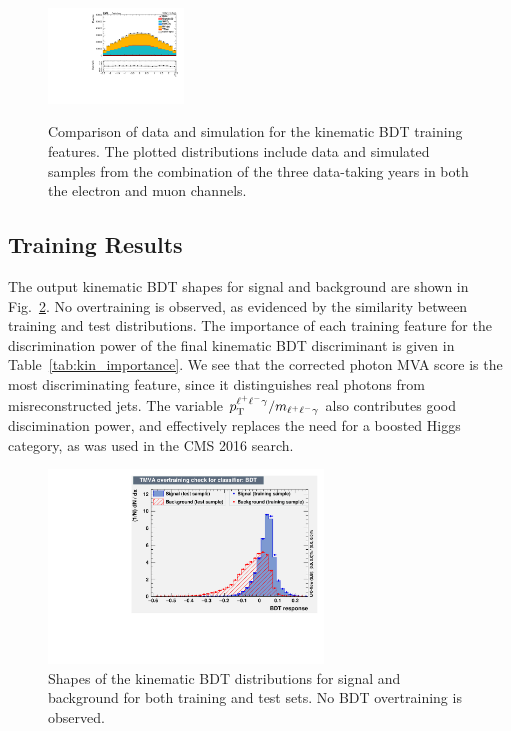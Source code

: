 \begin{figure}[tb]
\begin{center}
		\includegraphics[width=0.32\textwidth]{fig/MVA/sc_all_kin_lepeta1_valid_ptwei_cat0.pdf}\\
		\end{center}
	\caption{Comparison of data and simulation for the kinematic BDT training features. The plotted distributions include data and simulated samples from the combination of the three 
	data-taking years in both the electron and muon channels.}
	\label{fig:kin_vars1}
\end{figure}

\subsection{Training Results}
The output kinematic BDT shapes for signal and background are shown in Fig.~\ref{fig:kin_overtrain}. No overtraining is observed, 
as evidenced by the similarity between training and test distributions. The importance of each training feature for the discrimination power of
the final kinematic BDT discriminant is given in Table~\ref{tab:kin_importance}. We see that the corrected photon MVA score is the most discriminating 
feature, since it distinguishes real photons from misreconstructed jets. The variable $p_{\mathrm{T}}^{\ell^{+}\ell^{-}\gamma}/m_{\ell^{+}\ell^{-}\gamma}$ also contributes good discimination power, and 
effectively replaces the need for a boosted Higgs category, as was used in the CMS 2016 search. 

\begin{figure}[tb]
	\begin{center}
		\includegraphics[width=0.65\textwidth]{fig/MVA/kin_overtrain_BDT.pdf}
	\end{center}
	\caption{Shapes of the kinematic BDT distributions for signal and background for both training and test sets. No BDT overtraining is observed.}\label{fig:kin_overtrain}
\end{figure}

